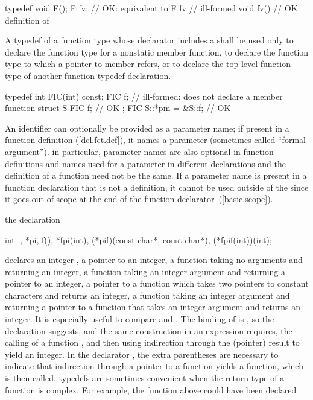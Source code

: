 \begin{codeblock}
typedef void F();
F  fv;				// OK: equivalent to 
F  fv { }			// ill-formed
void fv() { }			// OK: definition of 
\end{codeblock}
\exitexampleb
A typedef of a function type whose declarator includes a
shall be used only to declare the function type for a nonstatic member function,
to declare the function type to which a pointer to member refers,
or to declare the top-level function type of another function typedef
declaration.
\enterexample

\begin{codeblock}
typedef int FIC(int) const;
FIC f;				// ill-formed: does not declare a member function
struct S {
	FIC f;			// OK
};
FIC S::*pm = &S::f;		// OK
\end{codeblock}
\exitexampleb

\pnum
An identifier can optionally be provided as a parameter name;
if present in a function definition (\ref{dcl.fct.def}), it names a parameter (sometimes called ``formal argument'').
\enternote
in particular, parameter names are also optional in function definitions
and names used for a parameter in different declarations and the definition
of a function need not be the same.
If a parameter name is present in a function declaration that is not a definition,
it cannot be used outside of
the  since it goes out of scope
at the end of the function declarator~(\ref{basic.scope}).
\exitnote

\pnum
\enterexample
the declaration

%
\begin{codeblock}
int i,
    *pi,
    f(),
    *fpi(int),
    (*pif)(const char*, const char*),
    (*fpif(int))(int);
\end{codeblock}

declares an integer
,
a pointer
to an integer,
a function
taking no arguments and returning an integer,
a function
taking an integer argument and returning a pointer to an integer,
a pointer
to a function which
takes two pointers to constant characters and returns an integer,
a function
taking an integer argument and returning a pointer to a function that takes an integer argument and returns an integer.
It is especially useful to compare
and
.
The binding of
is
,
so the declaration suggests,
and the same construction in an expression
requires, the calling of a function
,
and then using indirection through the (pointer) result
to yield an integer.
In the declarator
,
the extra parentheses are necessary to indicate that indirection through
a pointer to a function yields a function, which is then called.
\exitexample
\enternote
typedefs are sometimes convenient when the return type of a function is complex.
For example,
the function
above could have been declared

